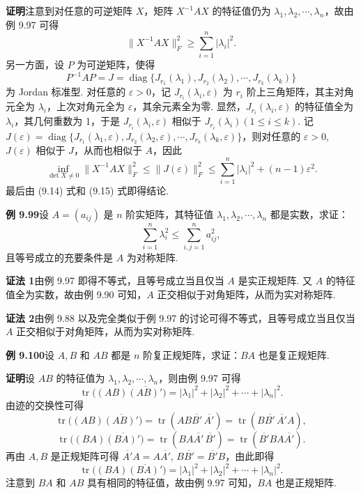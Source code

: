 \documentclass[UTF8,12pt,a4paper,fontset=fandol]{ctexart}
\begin{document}
\noindent\textbf{证明}\quad 注意到对任意的可逆矩阵 $X$，矩阵 $X^{-1}AX$ 的特征值仍为 $\lambda_1,\lambda_2,\cdots,\lambda_n$，故由例 9.97 可得
\begin{equation}
\|X^{-1}AX\|_F^2\ge\sum_{i=1}^n|\lambda_i|^2.
\tag{9.14}
\end{equation}
另一方面，设 $P$ 为可逆矩阵，使得
\[
P^{-1}AP=J=\operatorname{diag}\{J_{r_1}(\lambda_1),J_{r_2}(\lambda_2),\cdots,J_{r_k}(\lambda_k)\}
\]
为 Jordan 标准型. 对任意的 $\varepsilon>0$，记 $J_{r_i}(\lambda_i,\varepsilon)$ 为 $r_i$ 阶上三角矩阵，其主对角元全为 $\lambda_i$，上次对角元全为 $\varepsilon$，其余元素全为零. 显然，$J_{r_i}(\lambda_i,\varepsilon)$ 的特征值全为 $\lambda_i$，其几何重数为 1，于是 $J_{r_i}(\lambda_i,\varepsilon)$ 相似于 $J_{r_i}(\lambda_i)(1\le i\le k)$. 记 $J(\varepsilon)=\operatorname{diag}\{J_{r_1}(\lambda_1,\varepsilon),J_{r_2}(\lambda_2,\varepsilon),\cdots,J_{r_k}(\lambda_k,\varepsilon)\}$，则对任意的 $\varepsilon>0$, $J(\varepsilon)$ 相似于 $J$，从而也相似于 $A$，因此
\begin{equation}
\inf_{\det X\ne0}\|X^{-1}AX\|_F^2\le \|J(\varepsilon)\|_F^2\le\sum_{i=1}^n|\lambda_i|^2+(n-1)\varepsilon^2.
\tag{9.15}
\end{equation}
最后由 (9.14) 式和 (9.15) 式即得结论.

\noindent\textbf{例 9.99}\quad 设 $A=(a_{ij})$ 是 $n$ 阶实矩阵，其特征值 $\lambda_1,\lambda_2,\cdots,\lambda_n$ 都是实数，求证：
\[
\sum_{i=1}^n\lambda_i^2\le\sum_{i,j=1}^na_{ij}^2,
\]
且等号成立的充要条件是 $A$ 为对称矩阵.

\noindent\textbf{证法 1}\quad 由例 9.97 即得不等式，且等号成立当且仅当 $A$ 是实正规矩阵. 又 $A$ 的特征值全为实数，故由例 9.90 可知，$A$ 正交相似于对角矩阵，从而为实对称矩阵.

\noindent\textbf{证法 2}\quad 由例 9.88 以及完全类似于例 9.97 的讨论可得不等式，且等号成立当且仅当 $A$ 正交相似于对角矩阵，从而为实对称矩阵.

\noindent\textbf{例 9.100}\quad 设 $A,B$ 和 $AB$ 都是 $n$ 阶复正规矩阵，求证：$BA$ 也是复正规矩阵.

\noindent\textbf{证明}\quad 设 $AB$ 的特征值为 $\lambda_1,\lambda_2,\cdots,\lambda_n$，则由例 9.97 可得
\[
\operatorname{tr}\bigl((AB)\overline{(AB)'}\bigr)=|\lambda_1|^2+|\lambda_2|^2+\cdots+|\lambda_n|^2.
\]
由迹的交换性可得
\[
\operatorname{tr}\bigl((AB)\overline{(AB)'}\bigr)=\operatorname{tr}(AB\overline{B'}\,\overline{A'})=\operatorname{tr}(B\overline{B'}\,\overline{A'}A),
\]
\[
\operatorname{tr}\bigl((BA)\overline{(BA)'}\bigr)=\operatorname{tr}(BA\overline{A'}\,\overline{B'})=\operatorname{tr}(\overline{B'}BA\overline{A'}).
\]
再由 $A,B$ 是正规矩阵可得 $\overline{A'}A=A\overline{A'}$, $B\overline{B'}=\overline{B'}B$，由此即得
\[
\operatorname{tr}\bigl((BA)\overline{(BA)'}\bigr)=|\lambda_1|^2+|\lambda_2|^2+\cdots+|\lambda_n|^2.
\]
注意到 $BA$ 和 $AB$ 具有相同的特征值，故由例 9.97 可知，$BA$ 也是正规矩阵.
\end{document}
